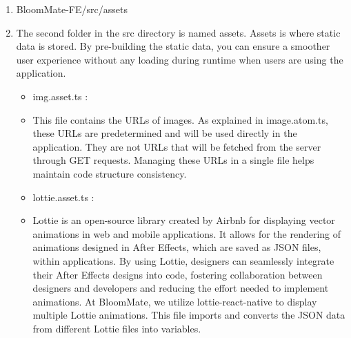 \documentclass[conference, a4paper]{IEEEtran}
\begin{document}
\begin{enumerate}
\begin{enumerate}
    \item BloomMate-FE/src/assets
    \item[] The second folder in the src directory is named assets. Assets is where static data is stored. By pre-building the static data, you can ensure a smoother user experience without any loading during runtime when users are using the application.
    \begin{itemize}
        \item img.asset.ts : 
        \item[] This file contains the URLs of images. As explained in image.atom.ts, these URLs are predetermined and will be used directly in the application. They are not URLs that will be fetched from the server through GET requests. Managing these URLs in a single file helps maintain code structure consistency.\\

        \item lottie.asset.ts :
        \item[] Lottie is an open-source library created by Airbnb for displaying vector animations in web and mobile applications. It allows for the rendering of animations designed in After Effects, which are saved as JSON files, within applications. By using Lottie, designers can seamlessly integrate their After Effects designs into code, fostering collaboration between designers and developers and reducing the effort needed to implement animations. At BloomMate, we utilize lottie-react-native to display multiple Lottie animations. This file imports and converts the JSON data from different Lottie files into variables.
    \end{itemize}


\end{enumerate}
\end{enumerate}
\end{document}
